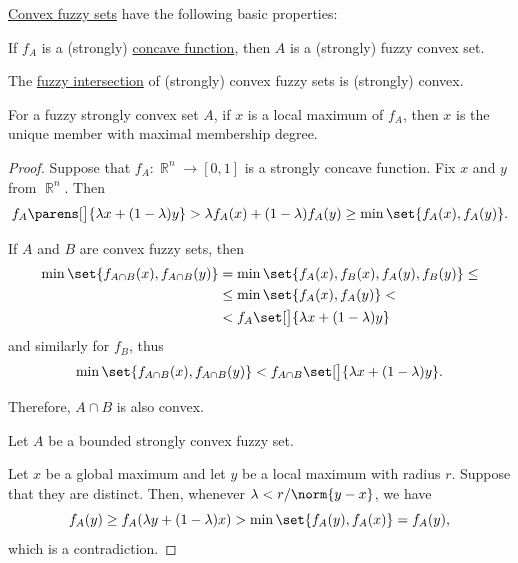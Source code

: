 \begin{proposition}\label{thm:def:convex_fuzzy_set}
  \hyperref[def:convex_fuzzy_set]{Convex fuzzy sets} have the following basic properties:
  \begin{thmenum}
     If \( f_A \) is a (strongly) \hyperref[def:convex_function]{concave function}, then \( A \) is a (strongly) fuzzy convex set.

     The \hyperref[def:basic_fuzzy_set_operations/intersection]{fuzzy intersection} of (strongly) convex fuzzy sets is (strongly) convex.

     For a fuzzy strongly convex set \( A \), if \( x \) is a local maximum of \( f_A \), then \( x \) is the unique member with maximal membership degree.
  \end{thmenum}
\end{proposition}
\begin{proof}
   Suppose that \( f_A: \BbbR^n \to [0, 1] \) is a strongly concave function. Fix \( x \) and \( y \) from \( \BbbR^n \). Then
  \begin{equation*}
    f_A\parens[\big]{ \lambda x + (1 - \lambda) y }
    >
    \lambda f_A(x) + (1 - \lambda) f_A(y)
    \geq
    \min\set{ f_A(x), f_A(y) }.
  \end{equation*}

   If \( A \) and \( B \) are convex fuzzy sets, then
  \begin{align*}
    \min\set{ f_{A \cap B}(x), f_{A \cap B}(y) }
    &=
    \min\set{ f_A(x), f_B(x), f_A(y), f_B(y) }
    \leq \\ &\leq
    \min\set{ f_A(x), f_A(y) }
    < \\ &<
    f_A \set[\big]{ \lambda x + (1 - \lambda) y }
  \end{align*}
  and similarly for \( f_B \), thus
  \begin{equation*}
    \min\set{ f_{A \cap B}(x), f_{A \cap B}(y) }
    <
    f_{A \cap B} \set[\big]{ \lambda x + (1 - \lambda) y }.
  \end{equation*}

  Therefore, \( A \cap B \) is also convex.

   Let \( A \) be a bounded strongly convex fuzzy set.

  Let \( x \) be a global maximum and let \( y \) be a local maximum with radius \( r \). Suppose that they are distinct. Then, whenever \( \lambda < r / \norm{y - x} \), we have
  \begin{equation*}
    f_A(y)
    \geq
    f_A(\lambda y + (1 - \lambda) x)
    >
    \min\set{ f_A(y), f_A(x) }
    =
    f_A(y),
  \end{equation*}
  which is a contradiction.
\end{proof}

